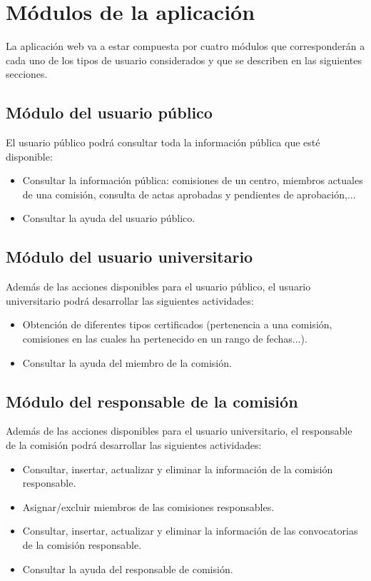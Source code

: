 \section{Módulos de la aplicación}\label{sec:modulos}

La aplicación web va a estar compuesta por cuatro módulos que corresponderán a cada uno de los tipos de usuario considerados y que se describen en las siguientes secciones.

\subsection{Módulo del usuario público}

El usuario público podrá consultar toda la información pública que esté disponible:
\begin{itemize}
    \item Consultar la información pública: comisiones de un centro, miembros actuales de una comisión, consulta de actas aprobadas y pendientes de aprobación,...
    \item Consultar la ayuda del usuario público.
\end{itemize}

\subsection{Módulo del usuario universitario}

Además de las acciones disponibles para el usuario público, el usuario universitario podrá desarrollar las siguientes actividades:
\begin{itemize}
    \item Obtención de diferentes tipos certificados (pertenencia a una comisión, comisiones en las cuales ha pertenecido en un rango de fechas...).
    \item Consultar la ayuda del miembro de la comisión.
\end{itemize}

\subsection{Módulo del responsable de la comisión}
Además de las acciones disponibles para el usuario universitario, el responsable de la comisión podrá desarrollar las siguientes actividades:

\begin{itemize}
    \item Consultar, insertar, actualizar y eliminar la información de la comisión responsable.
    \item Asignar/excluir miembros de las comisiones responsables.
    \item Consultar, insertar, actualizar y eliminar la información de las convocatorias de la comisión responsable.
    \item Consultar la ayuda del responsable de comisión.
\end{itemize}

